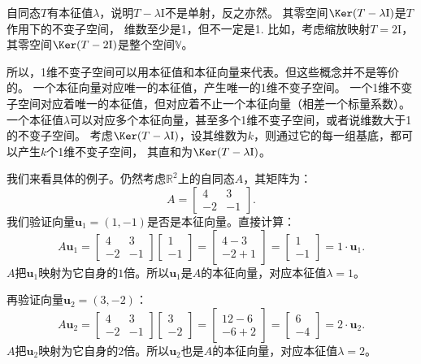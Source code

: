 \documentclass[12pt,UTF8,fontset=none]{ctexbook}
\begin{document}
自同态$T$有本征值$\lambda$，说明$T - \lambda \mathrm{I}$不是单射，反之亦然。
其零空间$\Ker (T - \lambda \mathrm{I})$是$T$作用下的不变子空间，
维数至少是1，但不一定是1. 比如，考虑缩放映射$T = 2\mathrm{I}$，
其零空间$\Ker (T - 2 \mathrm{I})$是整个空间$\mathbb{V}$。

所以，1维不变子空间可以用本征值和本征向量来代表。但这些概念并不是等价的。
一个本征向量对应唯一的本征值，产生唯一的1维不变子空间。
一个1维不变子空间对应着唯一的本征值，但对应着不止一个本征向量（相差一个标量系数）。
一个本征值$\lambda$可以对应多个本征向量，甚至多个1维不变子空间，或者说维数大于1的不变子空间。
考虑$\Ker (T - \lambda \mathrm{I})$，设其维数为$k$，则通过它的每一组基底，都可以产生$k$个1维不变子空间，
其直和为$\Ker (T - \lambda \mathrm{I})$。

我们来看具体的例子。仍然考虑$\mathbb{R}^2$上的自同态$A$，其矩阵为：
$$
A = \begin{bmatrix} 4 & 3 \\ -2 & -1 \end{bmatrix}.
$$
我们验证向量$\mathbf{u}_1 = (1,-1)$是否是本征向量。直接计算：
$$
A\mathbf{u}_1 = \begin{bmatrix} 4 & 3 \\ -2 & -1 \end{bmatrix}\begin{bmatrix} 1 \\ -1 \end{bmatrix} = \begin{bmatrix} 4-3 \\ -2+1 \end{bmatrix} = \begin{bmatrix} 1 \\ -1 \end{bmatrix} = 1 \cdot \mathbf{u}_1.
$$
$A$把$\mathbf{u}_1$映射为它自身的$1$倍。所以$\mathbf{u}_1$是$A$的本征向量，对应本征值$\lambda = 1$。

再验证向量$\mathbf{u}_2 = (3,-2)$：
$$
A \mathbf{u}_2 = \begin{bmatrix} 4 & 3 \\ -2 & -1 \end{bmatrix} \begin{bmatrix} 3 \\ -2 \end{bmatrix} = \begin{bmatrix} 12-6 \\ -6+2 \end{bmatrix} = \begin{bmatrix} 6 \\ -4 \end{bmatrix} = 2 \cdot \mathbf{u}_2.
$$
$A$把$\mathbf{u}_2$映射为它自身的$2$倍。所以$\mathbf{u}_2$也是$A$的本征向量，对应本征值$\lambda = 2$。
\end{document}
